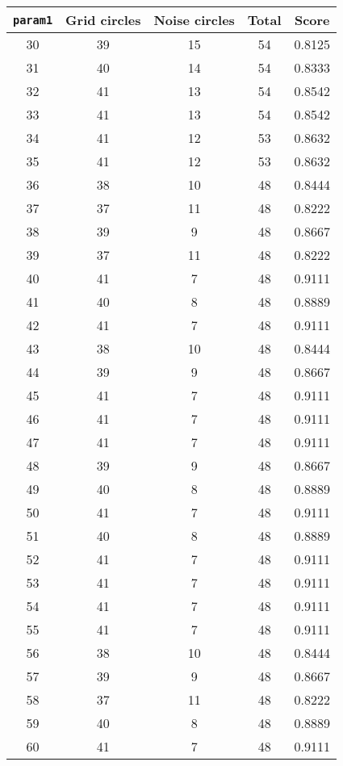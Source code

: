 \documentclass[letterpaper, 12pt]{article}
\begin{document}
\begin{longtable}{|c|c|c|c|c|}
\hline
\textbf{\texttt{param1}} & \textbf{Grid circles} & \textbf{Noise circles} & \textbf{Total} & \textbf{Score} \\
\hline
30 & 39 & 15 & 54 & 0.8125 \\
\hline
31 & 40 & 14 & 54 & 0.8333 \\
\hline
32 & 41 & 13 & 54 & 0.8542 \\
\hline
33 & 41 & 13 & 54 & 0.8542 \\
\hline
34 & 41 & 12 & 53 & 0.8632 \\
\hline
35 & 41 & 12 & 53 & 0.8632 \\
\hline
36 & 38 & 10 & 48 & 0.8444 \\
\hline
37 & 37 & 11 & 48 & 0.8222 \\
\hline
38 & 39 & 9 & 48 & 0.8667 \\
\hline
39 & 37 & 11 & 48 & 0.8222 \\
\hline
40 & 41 & 7 & 48 & 0.9111 \\
\hline
41 & 40 & 8 & 48 & 0.8889 \\
\hline
42 & 41 & 7 & 48 & 0.9111 \\
\hline
43 & 38 & 10 & 48 & 0.8444 \\
\hline
44 & 39 & 9 & 48 & 0.8667 \\
\hline
45 & 41 & 7 & 48 & 0.9111 \\
\hline
46 & 41 & 7 & 48 & 0.9111 \\
\hline
47 & 41 & 7 & 48 & 0.9111 \\
\hline
48 & 39 & 9 & 48 & 0.8667 \\
\hline
49 & 40 & 8 & 48 & 0.8889 \\
\hline
50 & 41 & 7 & 48 & 0.9111 \\
\hline
51 & 40 & 8 & 48 & 0.8889 \\
\hline
52 & 41 & 7 & 48 & 0.9111 \\
\hline
53 & 41 & 7 & 48 & 0.9111 \\
\hline
54 & 41 & 7 & 48 & 0.9111 \\
\hline
55 & 41 & 7 & 48 & 0.9111 \\
\hline
56 & 38 & 10 & 48 & 0.8444 \\
\hline
57 & 39 & 9 & 48 & 0.8667 \\
\hline
58 & 37 & 11 & 48 & 0.8222 \\
\hline
59 & 40 & 8 & 48 & 0.8889 \\
\hline
60 & 41 & 7 & 48 & 0.9111 \\
\hline

\end{longtable}
\end{document}
